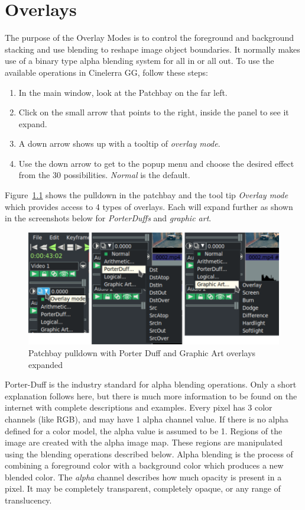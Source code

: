 \chapter{Overlays}%
\label{cha:overlays}

The purpose of the Overlay Modes is to control the foreground and background stacking and use blending to reshape image object boundaries.  It normally makes use of a binary type alpha blending system for all in or all out.  To use the available operations in Cinelerra GG, follow these steps:

\begin{enumerate}
    \item In the main window, look at the Patchbay on the far left.
    \item Click on the small arrow that points to the right, inside the panel to see it expand.
    \item A down arrow shows up with a tooltip of \textit{overlay mode}.
    \item Use the down arrow to get to the popup menu and choose the desired effect from the 30 possibilities.  \textit{Normal} is the default.
\end{enumerate}

Figure~\ref{fig:overlay-01} shows the pulldown in the patchbay and the tool tip \textit{Overlay mode} which provides access to 4 types of overlays.  Each will expand further as shown in the screenshots below for \textit{PorterDuffs} and \textit{graphic art}.

\begin{figure}[htpb]
    \centering
    \includegraphics[width=0.8\linewidth]{images/overlay-01.png}
    \caption{Patchbay pulldown with Porter Duff and Graphic Art overlays expanded}
    \label{fig:overlay-01}
\end{figure}

Porter-Duff is the industry standard for alpha blending operations.  Only a short explanation follows here, but there is much more information to be found on the internet with complete descriptions and examples.  Every pixel has 3 color channels (like RGB), and may have 1 alpha channel value.  If there is no alpha defined for a color model, the alpha value is assumed to be 1.  Regions of the image are created with the alpha image map.  These regions are manipulated using the blending operations described below.  Alpha blending is the process of combining a foreground color with a background color which produces a new blended color.  The \textit{alpha} channel describes how much opacity is present in a pixel.  It may be completely transparent, completely opaque, or any range of translucency.

